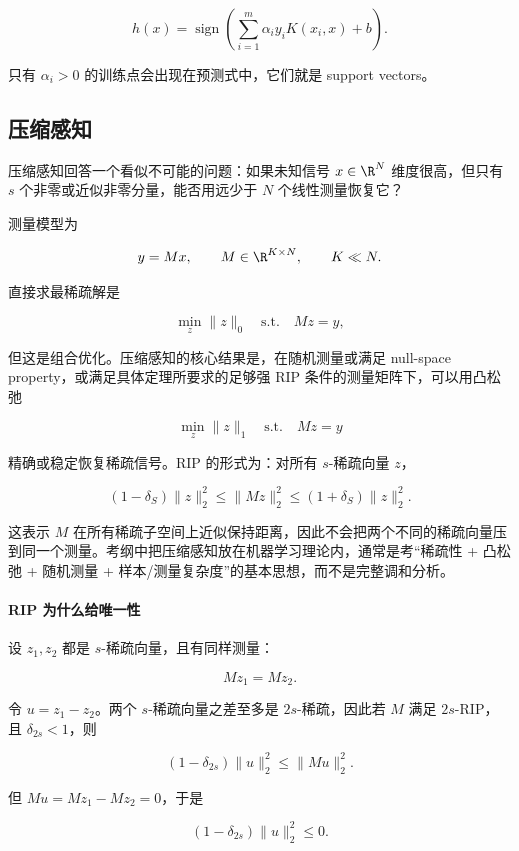 \[
  h(x)
  =
  \operatorname{sign}
  \left(
    \sum_{i=1}^{m}
    \alpha_i y_i K(x_i,x)
    +
    b
  \right).
\]

只有 \(\alpha_i>0\) 的训练点会出现在预测式中，它们就是 support vectors。

\subsection{压缩感知}


压缩感知回答一个看似不可能的问题：如果未知信号 \(x\in\R^N\) 维度很高，但只有 \(s\) 个非零或近似非零分量，能否用远少于 \(N\) 个线性测量恢复它？

测量模型为

\[
  y=Mx,
  \qquad
  M\in\R^{K\times N},
  \qquad
  K\ll N.
\]

直接求最稀疏解是

\[
  \min_z \|z\|_0
  \quad
  \text{s.t.}
  \quad
  Mz=y,
\]

但这是组合优化。压缩感知的核心结果是，在随机测量或满足 null-space property，或满足具体定理所要求的足够强 RIP 条件的测量矩阵下，可以用凸松弛

\[
  \min_z \|z\|_1
  \quad
  \text{s.t.}
  \quad
  Mz=y
\]

精确或稳定恢复稀疏信号。RIP 的形式为：对所有 \(s\)-稀疏向量 \(z\)，

\[
  (1-\delta_S)\|z\|_2^2
  \le
  \|Mz\|_2^2
  \le
  (1+\delta_S)\|z\|_2^2.
\]

这表示 \(M\) 在所有稀疏子空间上近似保持距离，因此不会把两个不同的稀疏向量压到同一个测量。考纲中把压缩感知放在机器学习理论内，通常是考“稀疏性 + 凸松弛 + 随机测量 + 样本/测量复杂度”的基本思想，而不是完整调和分析。

\paragraph{RIP 为什么给唯一性}

设 \(z_1,z_2\) 都是 \(s\)-稀疏向量，且有同样测量：

\[
  Mz_1=Mz_2.
\]

令 \(u=z_1-z_2\)。两个 \(s\)-稀疏向量之差至多是 \(2s\)-稀疏，因此若 \(M\) 满足 \(2s\)-RIP，且 \(\delta_{2s}<1\)，则

\[
  (1-\delta_{2s})\|u\|_2^2
  \le
  \|Mu\|_2^2.
\]

但 \(Mu=Mz_1-Mz_2=0\)，于是

\[
  (1-\delta_{2s})\|u\|_2^2\le 0.
\]

